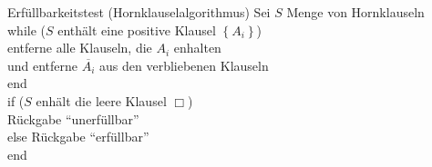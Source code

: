 \begin{frame}{Erfüllbarkeitstest (Hornklauselalgorithmus)}
	Sei $S$ Menge von Hornklauseln\\
	while ($S$ enthält eine positive Klausel $\left\{A_i\right\}$)\\
	\qquad entferne alle Klauseln, die $A_i$ enhalten\\
	\qquad und entferne $\overline{A_i}$ aus den verbliebenen Klauseln\\
	end\\
	if ($S$ enhält die leere Klausel $\Box$)\\
	\qquad Rückgabe "`unerfüllbar"'\\
	else Rückgabe "`erfüllbar"'\\
	end
\end{frame}

